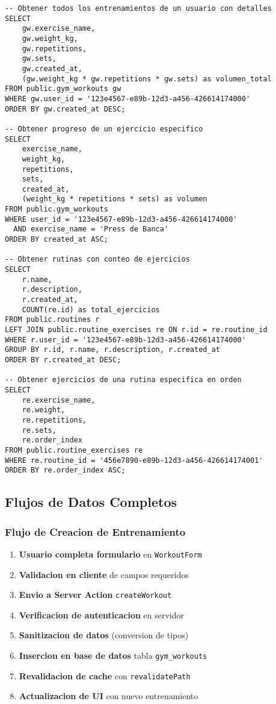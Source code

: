 \documentclass[12pt,a4paper]{article}
\begin{document}
\begin{lstlisting}[caption=Consultas utiles para analisis]
-- Obtener todos los entrenamientos de un usuario con detalles
SELECT 
    gw.exercise_name,
    gw.weight_kg,
    gw.repetitions,
    gw.sets,
    gw.created_at,
    (gw.weight_kg * gw.repetitions * gw.sets) as volumen_total
FROM public.gym_workouts gw
WHERE gw.user_id = '123e4567-e89b-12d3-a456-426614174000'
ORDER BY gw.created_at DESC;

-- Obtener progreso de un ejercicio especifico
SELECT 
    exercise_name,
    weight_kg,
    repetitions,
    sets,
    created_at,
    (weight_kg * repetitions * sets) as volumen
FROM public.gym_workouts
WHERE user_id = '123e4567-e89b-12d3-a456-426614174000'
  AND exercise_name = 'Press de Banca'
ORDER BY created_at ASC;

-- Obtener rutinas con conteo de ejercicios
SELECT 
    r.name,
    r.description,
    r.created_at,
    COUNT(re.id) as total_ejercicios
FROM public.routines r
LEFT JOIN public.routine_exercises re ON r.id = re.routine_id
WHERE r.user_id = '123e4567-e89b-12d3-a456-426614174000'
GROUP BY r.id, r.name, r.description, r.created_at
ORDER BY r.created_at DESC;

-- Obtener ejercicios de una rutina especifica en orden
SELECT 
    re.exercise_name,
    re.weight,
    re.repetitions,
    re.sets,
    re.order_index
FROM public.routine_exercises re
WHERE re.routine_id = '456e7890-e89b-12d3-a456-426614174001'
ORDER BY re.order_index ASC;
\end{lstlisting}

\subsection{Flujos de Datos Completos}

\subsubsection{Flujo de Creacion de Entrenamiento}

\begin{enumerate}
    \item \textbf{Usuario completa formulario} en \texttt{WorkoutForm}
    \item \textbf{Validacion en cliente} de campos requeridos
    \item \textbf{Envio a Server Action} \texttt{createWorkout}
    \item \textbf{Verificacion de autenticacion} en servidor
    \item \textbf{Sanitizacion de datos} (conversion de tipos)
    \item \textbf{Insercion en base de datos} tabla \texttt{gym\_workouts}
    \item \textbf{Revalidacion de cache} con \texttt{revalidatePath}
    \item \textbf{Actualizacion de UI} con nuevo entrenamiento
\end{enumerate}
\end{document}
